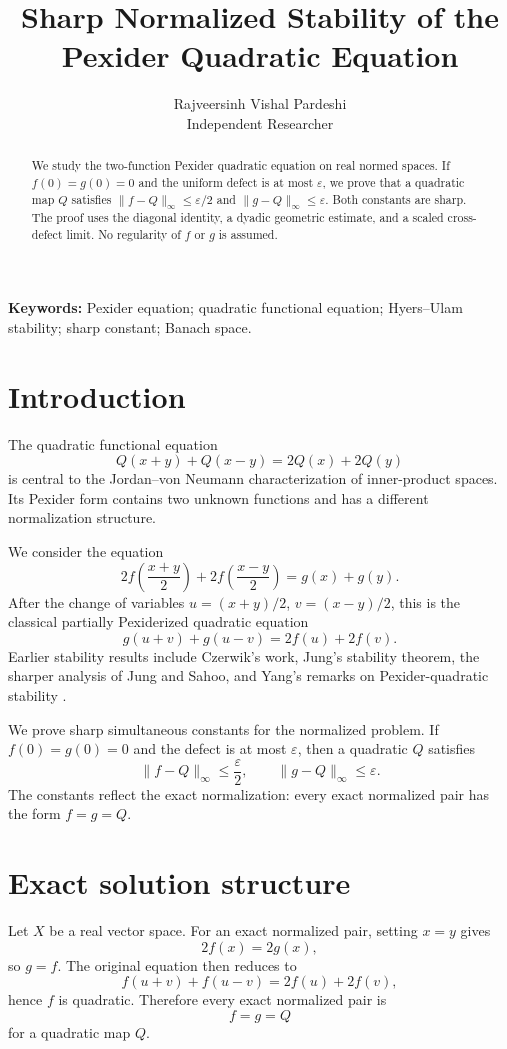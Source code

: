 \documentclass[11pt]{article}
\title{Sharp Normalized Stability of the Pexider Quadratic Equation}
\author{Rajveersinh Vishal Pardeshi\\
Independent Researcher}
\theoremstyle{definition}
\theoremstyle{remark}
\begin{document}
\maketitle

\begin{abstract}
We study the two-function Pexider quadratic equation on real normed spaces. If $f(0)=g(0)=0$ and the uniform defect is at most $\varepsilon$, we prove that a quadratic map $Q$ satisfies $\|f-Q\|_\infty\le\varepsilon/2$ and $\|g-Q\|_\infty\le\varepsilon$. Both constants are sharp. The proof uses the diagonal identity, a dyadic geometric estimate, and a scaled cross-defect limit. No regularity of $f$ or $g$ is assumed.
\end{abstract}

\textbf{Keywords:} Pexider equation; quadratic functional equation; Hyers--Ulam stability; sharp constant; Banach space.

\section{Introduction}

The quadratic functional equation
\[
Q(x+y)+Q(x-y)=2Q(x)+2Q(y)
\]
is central to the Jordan--von Neumann characterization of inner-product spaces. Its Pexider form contains two unknown functions and has a different normalization structure.

We consider the equation
\[
2f\!\left(\frac{x+y}{2}\right)+2f\!\left(\frac{x-y}{2}\right)=g(x)+g(y).
\]
After the change of variables $u=(x+y)/2$, $v=(x-y)/2$, this is the classical partially Pexiderized quadratic equation
\[
g(u+v)+g(u-v)=2f(u)+2f(v).
\]
Earlier stability results include Czerwik's work, Jung's stability theorem, the sharper analysis of Jung and Sahoo, and Yang's remarks on Pexider-quadratic stability \cite{jung2000,jung2001,yang2004pexider}.

We prove sharp simultaneous constants for the normalized problem. If $f(0)=g(0)=0$ and the defect is at most $\varepsilon$, then a quadratic $Q$ satisfies
\[
\|f-Q\|_\infty\le\frac{\varepsilon}{2},\qquad
\|g-Q\|_\infty\le\varepsilon.
\]
The constants reflect the exact normalization: every exact normalized pair has the form $f=g=Q$.

\section{Exact solution structure}

Let $X$ be a real vector space. For an exact normalized pair, setting $x=y$ gives
\[
2f(x)=2g(x),
\]
so $g=f$. The original equation then reduces to
\[
f(u+v)+f(u-v)=2f(u)+2f(v),
\]
hence $f$ is quadratic. Therefore every exact normalized pair is
\[
f=g=Q
\]
for a quadratic map $Q$.
\end{document}
